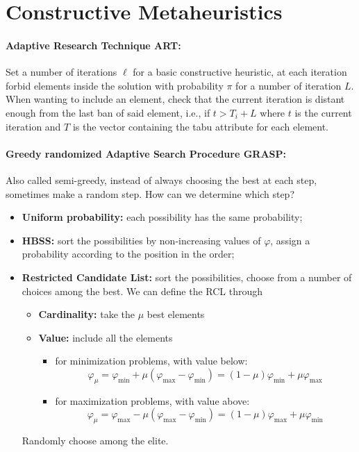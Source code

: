\documentclass{article}
\begin{document}
	\section*{Constructive Metaheuristics}
	
	\paragraph{Adaptive Research Technique ART:} Set a number of iterations $\ell$ for a basic constructive heuristic, at each iteration forbid elements inside the solution with probability $\pi$ for a number of iteration $L$. When wanting to include an element, check that the current iteration is distant enough from the last ban of said element, i.e., if $t > T_i + L$ where $t$ is the current iteration and $T$ is the vector containing the tabu attribute for each element.\\
	
	\paragraph{Greedy randomized Adaptive Search Procedure GRASP:} Also called semi-greedy, instead of always choosing the best at each step, sometimes make a random step. How can we determine which step? 
	\begin{itemize}
		\item \textbf{Uniform probability:} each possibility has the same probability;
		\item \textbf{HBSS:} sort the possibilities by non-increasing values of $\varphi$, assign a probability according to the position in the order;
		\item \textbf{Restricted Candidate List:} sort the possibilities, choose from a number of choices among the best. We can define the RCL through 
		\begin{itemize}
			\item \textbf{Cardinality:} take the $\mu$ best elements
			\item \textbf{Value:} include all the elements 
			\begin{itemize}
				\item for minimization problems, with value below:
				$$ \varphi_\mu = \varphi_{\min} + \mu(\varphi_{\max} - \varphi_{\min}) = (1 - \mu) \varphi_{\min} + \mu \varphi_{\max} $$
				\item for maximization problems, with value above:
				$$ \varphi_\mu = \varphi_{\max} - \mu (\varphi_{\max} - \varphi_{\min}) = (1 - \mu) \varphi_{\max} + \mu \varphi_{\min} $$
			\end{itemize}
		\end{itemize}
		Randomly choose among the elite.\\
	\end{itemize}
	
\end{document}
